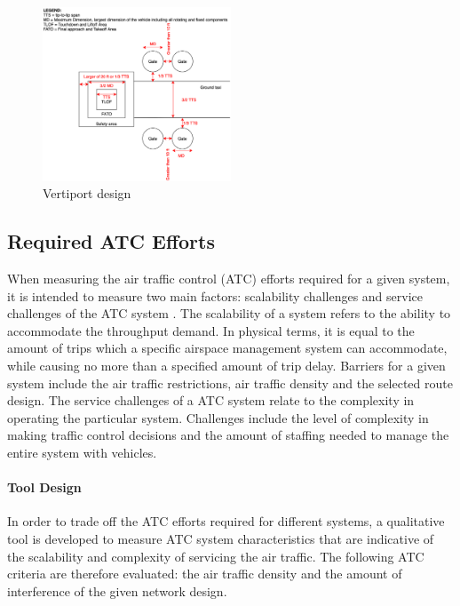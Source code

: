 \begin{figure}[H]
    \centering
    \includegraphics[width=0.5\textwidth]{Figures/Vertiport_design.png}
    \captionsetup{justification=centering}
    \caption{Vertiport design}
    \label{fig:vertiport}
\end{figure}

















\subsection{Required ATC Efforts}
When measuring the air traffic control (ATC) efforts required for a given system, it is intended to measure two main factors: scalability challenges and service challenges of the ATC system \cite{ATC}. The scalability of a system refers to the ability to accommodate the throughput demand. In physical terms, it is equal to the amount of trips which a specific airspace management system can accommodate, while causing no more than a specified amount of trip delay. Barriers for a given system include the air traffic restrictions, air traffic density and the selected route design.
The service challenges of a ATC system relate to the complexity in operating the particular system. Challenges include the level of complexity in making traffic control decisions and the amount of staffing needed to manage the entire system with vehicles.

\paragraph{Tool Design}
In order to trade off the ATC efforts required for different systems, a qualitative tool is developed to measure ATC system characteristics that are indicative of the scalability and complexity of servicing the air traffic. The following ATC criteria are therefore evaluated: the air traffic density and the amount of interference of the given network design. \\

